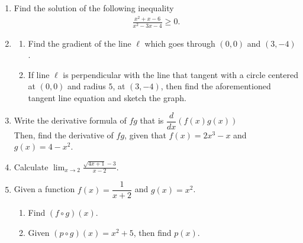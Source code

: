 \documentclass[10pt,openany,a4paper]{article}
\theoremstyle{definition}
\theoremstyle{definition}
\theoremstyle{plain}
\begin{document}
\newpage

\begin{enumerate}
    \item Find the solution of the following inequality
    \begin{align*}
        \frac{x^2+x-6}{x^2-3x-4}\geq 0.
    \end{align*}

    \item \begin{enumerate}
        \item Find the gradient of the line $\ell$ which goes through $(0,0)$ and $(3,-4)$.
        \item If line $\ell$ is perpendicular with the line that tangent with a circle centered at $(0,0)$ and radius $5$, at $(3,-4)$, then find the aforementioned tangent line equation and sketch the graph.
    \end{enumerate}

    \item Write the derivative formula of $fg$ that is $\dfrac{d}{dx}(f(x)g(x))$\\
    Then, find the derivative of $fg$, given that $f(x)=2x^3-x$ and $g(x)=4-x^2$.

    \item Calculate $\displaystyle\lim_{x\to 2}\frac{\sqrt{4x+1}-3}{x-2}$.

    \item Given a function $f(x)=\dfrac{1}{x+2}$ and $g(x)=x^2$.
    \begin{enumerate}
        \item Find $(f\circ g)(x)$.
        \item Given $(p\circ g)(x)=x^2+5$, then find $p(x)$.
    \end{enumerate}
\end{enumerate}

\newpage
\end{document}
